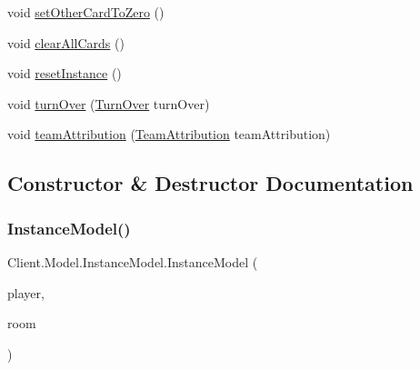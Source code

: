 \begin{DoxyCompactItemize}
\item 
void \mbox{\hyperlink{classClient_1_1Model_1_1InstanceModel_a2497f3fa4b9239e4d15b7ecc6e71e451}{set\+Other\+Card\+To\+Zero}} ()
\item 
void \mbox{\hyperlink{classClient_1_1Model_1_1InstanceModel_a88f9dcbbcb9095e04548af160d361bf0}{clear\+All\+Cards}} ()
\item 
void \mbox{\hyperlink{classClient_1_1Model_1_1InstanceModel_aa6cbe5a7384a553633925542d2d03982}{reset\+Instance}} ()
\item 
void \mbox{\hyperlink{classClient_1_1Model_1_1InstanceModel_a5d3dbc02d71df092c92de89e94ba3fff}{turn\+Over}} (\mbox{\hyperlink{classCommon_1_1TurnOver}{Turn\+Over}} turn\+Over)
\item 
void \mbox{\hyperlink{classClient_1_1Model_1_1InstanceModel_a36b2da19e784f1822d27b2803a0e3f2e}{team\+Attribution}} (\mbox{\hyperlink{classCommon_1_1TeamAttribution}{Team\+Attribution}} team\+Attribution)
\end{DoxyCompactItemize}


\subsection{Constructor \& Destructor Documentation}
\mbox{\label{classClient_1_1Model_1_1InstanceModel_ad2f61d837a1d5b806b772d8a4a7430d8}} 
\subsubsection{\texorpdfstring{Instance\+Model()}{InstanceModel()}\hspace{0.1cm}{\footnotesize\ttfamily [1/3]}}
{\footnotesize\ttfamily Client.\+Model.\+Instance\+Model.\+Instance\+Model (\begin{DoxyParamCaption}\item[{\mbox{\hyperlink{classCommon_1_1Player}{Player}}}]{player,  }\item[{\mbox{\hyperlink{classCommon_1_1RoomInfo}{Room\+Info}}}]{room }\end{DoxyParamCaption})\hspace{0.3cm}{\ttfamily [inline]}}

\mbox{\label{classClient_1_1Model_1_1InstanceModel_acb00a285b30ad1851157852624d59499}} 
